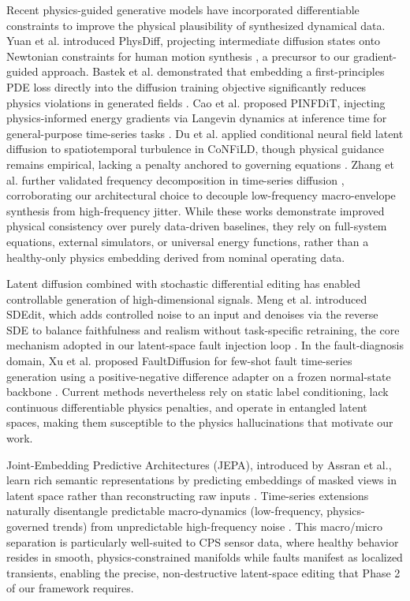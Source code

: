 \documentclass[conference]{IEEEtran}
\begin{document}
Recent physics-guided generative models have incorporated differentiable constraints to improve the physical plausibility of synthesized dynamical data. Yuan et al. introduced PhysDiff, projecting intermediate diffusion states onto Newtonian constraints for human motion synthesis \cite{physdiff2023}, a precursor to our gradient-guided approach. Bastek et al. demonstrated that embedding a first-principles PDE loss directly into the diffusion training objective significantly reduces physics violations in generated fields \cite{bastek2025}. Cao et al. proposed PINFDiT, injecting physics-informed energy gradients via Langevin dynamics at inference time for general-purpose time-series tasks \cite{pinfdit2026}. Du et al. applied conditional neural field latent diffusion to spatiotemporal turbulence in CoNFiLD, though physical guidance remains empirical, lacking a penalty anchored to governing equations \cite{confild2024}. Zhang et al. further validated frequency decomposition in time-series diffusion \cite{zhang2026frequency}, corroborating our architectural choice to decouple low-frequency macro-envelope synthesis from high-frequency jitter. While these works demonstrate improved physical consistency over purely data-driven baselines, they rely on full-system equations, external simulators, or universal energy functions, rather than a healthy-only physics embedding derived from nominal operating data.
 
Latent diffusion combined with stochastic differential editing has enabled controllable generation of high-dimensional signals. Meng et al. introduced SDEdit, which adds controlled noise to an input and denoises via the reverse SDE to balance faithfulness and realism without task-specific retraining, the core mechanism adopted in our latent-space fault injection loop \cite{sdedit2021}. In the fault-diagnosis domain, Xu et al. proposed FaultDiffusion for few-shot fault time-series generation using a positive-negative difference adapter on a frozen normal-state backbone \cite{xu2025faultdiffusion}. Current methods nevertheless rely on static label conditioning, lack continuous differentiable physics penalties, and operate in entangled latent spaces, making them susceptible to the physics hallucinations that motivate our work.
 
Joint-Embedding Predictive Architectures (JEPA), introduced by Assran et al., learn rich semantic representations by predicting embeddings of masked views in latent space rather than reconstructing raw inputs \cite{jepa2024}. Time-series extensions naturally disentangle predictable macro-dynamics (low-frequency, physics-governed trends) from unpredictable high-frequency noise \cite{ennadir2025tsjepa, he2026mtsjepa, verdenius2024latpfn}. This macro/micro separation is particularly well-suited to CPS sensor data, where healthy behavior resides in smooth, physics-constrained manifolds while faults manifest as localized transients, enabling the precise, non-destructive latent-space editing that Phase 2 of our framework requires.
 
\end{document}
